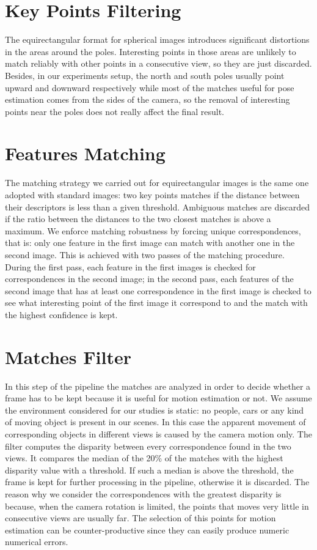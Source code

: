 \section{Key Points Filtering}
The equirectangular format for spherical images introduces significant 
distortions in the areas around the poles. Interesting points in those areas 
are unlikely to match reliably with other points in a consecutive view, 
so they are just discarded.
Besides, in our experiments setup, the north and south poles usually point 
upward and downward respectively while most of the matches useful for pose 
estimation comes from the sides of the camera, so the removal of interesting 
points near the poles does not really affect the final result.

\section{Features Matching}
The matching strategy we carried out for equirectangular images is the same one 
adopted with standard images: two key points matches if the distance between 
their descriptors is less than a given threshold. Ambiguous matches 
are discarded if the ratio between the distances to the two closest matches is 
above a maximum.
We enforce matching robustness by forcing unique correspondences, that is:
only one feature in the first image can match with another one in the second
image. This is achieved with two passes of the matching procedure. During the 
first pass, each feature in the first images is checked for correspondences in
the second image; in the second pass, each features of the second image that 
has at least one correspondence in the first image is checked to see what 
interesting point of the first image it correspond to and the match with the
highest confidence is kept.

\section{Matches Filter}
In this step of the pipeline the matches are analyzed in order to decide 
whether a frame has to be kept because it is useful for motion estimation or
not.
We assume the environment considered for our studies is static: no people, 
cars or any kind of moving object is present in our scenes. In this case the 
apparent movement of corresponding objects in different views is caused by 
the camera motion only.
The filter computes the disparity between every correspondence found in the 
two views. It compares the median of the 20\% of the matches with the highest 
disparity value with a threshold. If such a median is above 
the threshold, the frame is kept for further processing in the pipeline, 
otherwise it is discarded.
The reason why we consider the correspondences with the greatest disparity is 
because, when the camera rotation is limited, the points that moves very little 
in consecutive views are usually far. The selection of this points for motion 
estimation can be counter-productive since they can easily produce numeric 
numerical errors. 

